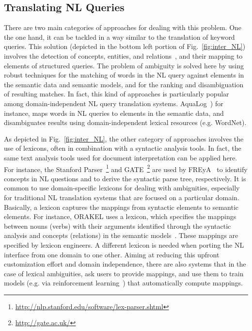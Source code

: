 \subsection{Translating NL Queries} There are two main categories of approaches for dealing with this problem. One the one hand, it can be tackled in a way similar to the translation of keyword queries. This solution (depicted in the bottom left portion of Fig.~\ref{fig:inter_NL}) involves the detection of concepts, entities, and relations~\cite{DBLP:conf/aswc/CaoCT08}, and their mapping to elements of structured queries. The problem of ambiguity is solved here by using robust techniques for the matching of words in the NL query against elements in the semantic data and semantic models, and for the ranking and disambiguation of resulting matches. In fact, this kind of approaches is particularly popular among domain-independent NL query translation systems. AquaLog~\cite{DBLP:journals/ws/LopezUMP07}) for instance, maps words in NL queries to elements in the semantic data, and disambiguates results using domain-independent lexical resources (e.g. WordNet). 

As depicted in Fig.~\ref{fig:inter_NL}, the other category of approaches involves the use of lexicons, often in combination with a syntactic analysis tools. 
In fact, the same text analysis tools used for document interpretation can be applied here. For instance, the Stanford Parser~\footnote{\url{http://nlp.stanford.edu/software/lex-parser.shtml}} and GATE~\footnote{\url{http://gate.ac.uk/}} are used by FREyA~\cite{DBLP:conf/esws/DamljanovicAC10} to identify concepts in NL questions and to derive the syntactic parse tree, respectively. It is common to use domain-specific lexicons for dealing with ambiguities, especially for traditional NL translation systems that are focused on a particular domain. Basically, a lexicon captures the mappings from syntactic elements to semantic elements. For instance, ORAKEL uses a lexicon, which specifies the mappings between nouns (verbs) with their arguments identified through the syntactic analysis and concepts (relations) in the semantic models~\cite{DBLP:journals/dke/CimianoHHMS08}. These mappings are specified by lexicon engineers. A different lexicon is needed when porting the NL interface from one domain to one other. Aiming at reducing this upfront customization effort and domain independence, there are also systems that in the case of lexical ambiguities, ask users to provide mappings, and use them to train models (e.g. via reinforcement learning~\cite{DBLP:conf/esws/DamljanovicAC10}) that automatically compute mappings. 

